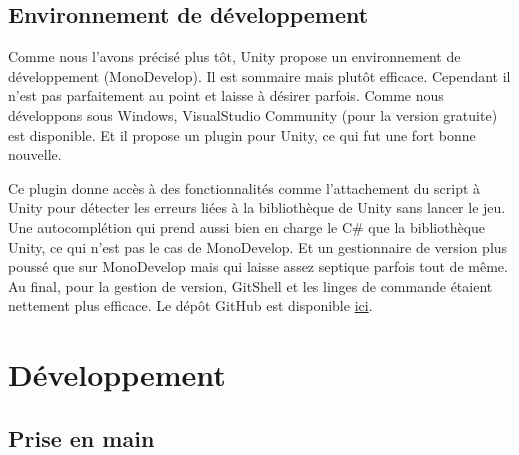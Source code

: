 \documentclass[a4paper,11pt]{myreport}
\begin{document}
\subsection{Environnement de développement}
\par Comme nous l'avons précisé plus tôt, Unity propose un environnement de développement (MonoDevelop). Il est sommaire mais plutôt efficace. Cependant il n'est pas parfaitement au point et laisse à désirer parfois.
Comme nous développons sous Windows, VisualStudio Community (pour la version gratuite) est disponible. Et il propose un plugin pour Unity, ce qui fut une fort bonne nouvelle.
\par Ce plugin donne accès à des fonctionnalités comme l'attachement du script à Unity pour détecter les erreurs liées à la bibliothèque de Unity sans lancer le jeu. Une autocomplétion qui prend aussi bien en charge le C\# que la bibliothèque Unity, ce qui n'est pas le cas de MonoDevelop. Et un gestionnaire de version plus poussé que sur MonoDevelop mais qui laisse assez septique parfois tout de même.
Au final, pour la gestion de version, GitShell et les linges de commande étaient nettement plus efficace. Le dépôt GitHub est disponible \href{https://github.com/manumanmax/SeriousVR.git}{ici}.

\section{Développement}
\subsection{Prise en main}
\end{document}
